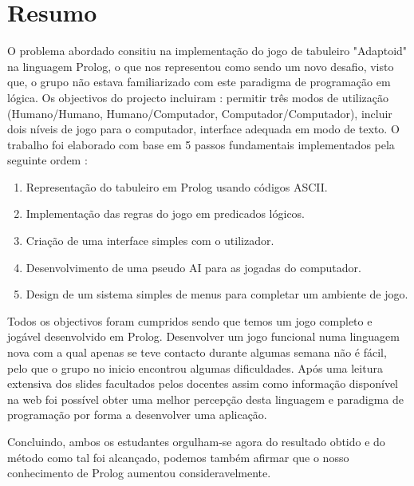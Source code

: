 \documentclass[a4paper]{article}
\begin{document}

\newpage

\section*{Resumo}
O problema abordado consitiu na implementação do jogo de tabuleiro "Adaptoid" na linguagem Prolog, o que nos representou como sendo um novo desafio, visto que, o grupo não estava familiarizado com este paradigma de programação em lógica. Os objectivos do projecto incluiram : permitir três modos de utilização (Humano/Humano, Humano/Computador, Computador/Computador), incluir dois níveis de jogo para o computador, interface adequada em modo de texto. O trabalho foi elaborado com base em 5 passos fundamentais implementados pela seguinte ordem :
\begin{enumerate}
    \item Representação do tabuleiro em Prolog usando códigos ASCII.
    \item Implementação das regras do jogo em predicados lógicos.
    \item Criação de uma interface simples com o utilizador.
    \item Desenvolvimento de uma pseudo AI para as jogadas do computador.
    \item Design de um sistema simples de menus para completar um ambiente de jogo.
\end{enumerate}

Todos os objectivos foram cumpridos sendo que temos um jogo completo e jogável desenvolvido em Prolog. Desenvolver um jogo funcional numa linguagem nova com a qual apenas se teve contacto durante algumas semana não é fácil, pelo que o grupo no inicio encontrou algumas dificuldades. Após uma leitura extensiva dos slides facultados pelos docentes assim como informação disponível na web foi possível obter uma melhor percepção desta linguagem e paradigma de programação por forma a desenvolver uma aplicação.


Concluindo, ambos os estudantes orgulham-se agora do resultado obtido e do método como tal foi alcançado, podemos também afirmar que o nosso conhecimento de Prolog aumentou consideravelmente.
\newpage

\tableofcontents

\end{document}
